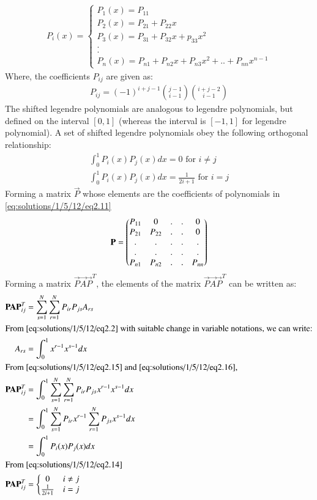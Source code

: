 \begin{align}
    P_i(x)=
    \left\{\begin{matrix}
P_1(x)=P_{11}\\ 
P_2(x)=P_{21}+P_{22}x\\
P_3(x)=P_{31}+P_{32}x+p_{33}x^2\\
.\\.\\
P_n(x)=P_{n1}+P_{n2}x+P_{n3}x^2+..+P_{nn}x^{n-1}
\end{matrix}\right. \label{eq:solutions/1/5/12/eq2.11}
\end{align}
Where, the coefficients $P_{ij}$ are given as:
\begin{align}
P_{ij}=(-1)^{i+j-1} {j-1 \choose i-1} {i+j-2 \choose i-1} \label{eq:solutions/1/5/12/eq2.12}
\end{align}
The shifted legendre polynomials are analogous to legendre polynomials, but defined on the interval $[0,1]$ (whereas the interval is $[-1,1]$ for legendre polynomial). \newpage
A set of shifted legendre polynomials obey the following orthogonal relationship:
\begin{align}
    \int_{0}^{1}P_i(x)P_j(x)dx=0\text{ for }i \neq j\\
    \int_{0}^{1}P_i(x)P_j(x)dx=\frac{1}{2i+1}\text{ for }i=j \label{eq:solutions/1/5/12/eq2.14}
\end{align}
Forming a matrix $\vec{P}$ whose elements are the coefficients of polynomials in \eqref{eq:solutions/1/5/12/eq2.11}
\begin{align}
    \vec{P}=\myvec{P_{11} & 0 &.&.&0\\
    P_{21} & P_{22} &.&.&0\\
    .&.&.&.&.\\.&.&.&.&.\\P_{n1} & P_{n2} &.&.&P_{nn}}
\end{align}
Forming a matrix $\vec{P}\vec{A}\vec{P}^T$, the elements of the matrix $\vec{P}\vec{A}\vec{P}^T$ can be written as:
\begin{align}
    \vec{P}\vec{A}\vec{P}^T_{ij}&=\sum_{s=1}^N\sum_{r=1}^NP_{ir}P_{js}A_{rs} \label{eq:solutions/1/5/12/eq2.15}
    \\
    \intertext{From \eqref{eq:solutions/1/5/12/eq2.2} with suitable change in variable notations, we can write:}
    A_{rs}&=\int_0^1x^{r-1}x^{s-1}dx \label{eq:solutions/1/5/12/eq2.16}\\
    \intertext{From \eqref{eq:solutions/1/5/12/eq2.15} and \eqref{eq:solutions/1/5/12/eq2.16},}
    \vec{P}\vec{A}\vec{P}^T_{ij}&=\int_0^1\sum_{s=1}^N\sum_{r=1}^NP_{ir}P_{js}x^{r-1}x^{s-1}dx\\
    &=\int_0^1\sum_{s=1}^NP_{ir}x^{r-1}\sum_{r=1}^NP_{js}x^{s-1}dx \\
    &=\int_0^1P_i(x)P_j(x)dx\\
    \intertext{From \eqref{eq:solutions/1/5/12/eq2.14}}
    \vec{P}\vec{A}\vec{P}^T_{ij}&=
    \left\{\begin{matrix}
    0 & i\neq j\\ 
    \frac{1}{2i+1} & i=j
    \end{matrix}\right.
\end{align}
